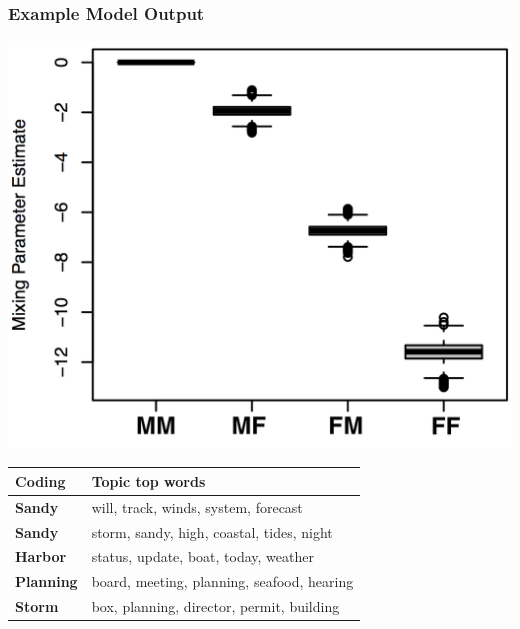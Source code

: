 \documentclass[xcolor={table}, fleqn]{beamer}
\newcommand{\male}[1]{\colorbox{male}{#1}}
\begin{document}
\begin{frame}\frametitle{Example Model Output}
	
	\centering
	\includegraphics[width = .56\textwidth]{./images/Dare_3_MP.png}\\
	\begin{tabular}{l l}
	\toprule
	Coding & Topic top words\\
	\midrule
	\male{\textbf{Sandy}} & will, track, winds, system, forecast\\ 
	\male{\textbf{Sandy}} & storm, sandy, high, coastal, tides, night\\ 
	\male{\textbf{Harbor}} & status, update, boat, today, weather\\ 
	\male{\textbf{Planning}} & board, meeting, planning, seafood, hearing\\ 
	\male{\textbf{Storm}} & box, planning, director,  permit, building \\ 
	\bottomrule

	\end{tabular}
	
\end{frame}
\end{document}
